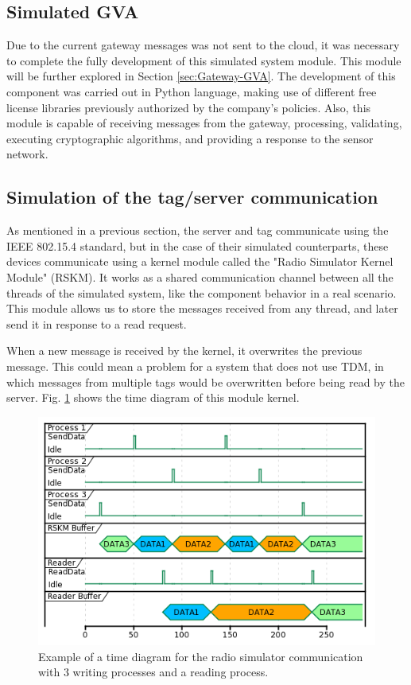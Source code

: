 \documentclass[journal]{IEEEtran}	%
\begin{document}
\subsection{Simulated GVA}


Due to the current gateway messages was not sent to the cloud, it was necessary to complete the fully development of this simulated system module. This module will be further explored in Section \ref{sec:Gateway-GVA}. The development of this component was carried out in Python language, making use of different free license libraries previously authorized by the company's policies. Also, this module is capable of receiving messages from the gateway, processing, validating, executing cryptographic algorithms, and providing a response to the sensor network.


\subsection{Simulation of the tag/server communication}


As mentioned in a previous section, the server and tag communicate using the IEEE 802.15.4 standard, but in the case of their simulated counterparts, these devices communicate using a kernel module called the "Radio Simulator Kernel Module" (RSKM). It works as a shared communication channel between all the threads of the simulated system, like the component behavior in a real scenario. This module allows us to store the messages received from any thread, and later send it in response to a read request.

When a new message is received by the kernel, it overwrites the previous message. This could mean a problem for a system that does not use TDM, in which messages from multiple tags would be overwritten before being read by the server. Fig.  \ref{fig:radio_kernel} shows the time diagram of this module kernel.

\begin{figure}[t!]
\centering
\includegraphics[width=0.98\columnwidth]{radiokernel.png}
\caption{Example of a time diagram for the radio simulator communication with 3 writing processes and a reading process.}
\label{fig:radio_kernel}
\end{figure}
\end{document}
